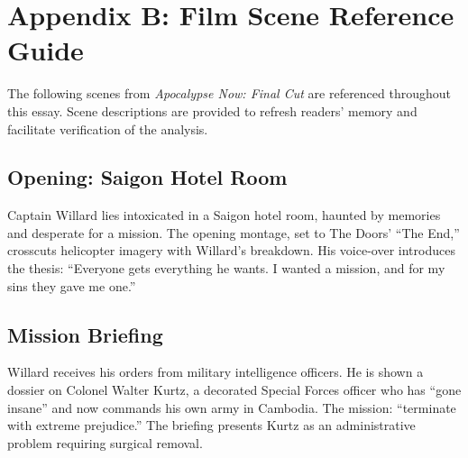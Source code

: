 \section*{Appendix B: Film Scene Reference Guide}
\label{app:scene-reference}

The following scenes from \textit{Apocalypse Now: Final Cut} \parencite{CoppolaApocalypse2019}
are referenced throughout this essay. Scene descriptions are provided to refresh readers'
memory and facilitate verification of the analysis.

\begin{minipage}{\textwidth}
	\subsection*{Opening: Saigon Hotel Room}
	\label{scene:saigon-opening}

	Captain Willard lies intoxicated in a Saigon hotel room, haunted by memories and desperate for
	a mission. The opening montage, set to The Doors' ``The End,'' crosscuts helicopter imagery
	with Willard's breakdown. His voice-over introduces the thesis: ``Everyone gets everything he
	wants. I wanted a mission, and for my sins they gave me one.''
\end{minipage}
\bigskip

\begin{minipage}{\textwidth}
	\subsection*{Mission Briefing}
	\label{scene:briefing}

	Willard receives his orders from military intelligence officers. He is shown a dossier on
	Colonel Walter Kurtz, a decorated Special Forces officer who has ``gone insane'' and now
	commands his own army in Cambodia. The mission: ``terminate with extreme prejudice.'' The
	briefing presents Kurtz as an administrative problem requiring surgical removal.
\end{minipage}
\bigskip

